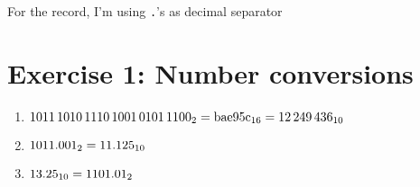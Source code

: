 \documentclass{gadsescript}
\begin{document}
\maketitle

For the record, I'm using \verb|.|'s as decimal separator
\section*{Exercise 1: Number conversions}
\begin{enumerate}[label=\alph*)]
	\item $ \binnum{1011 1010 1110 1001 0101 1100} = \hexnum{bae95c} = \decnum{12249436} $
	\item $ \binnum{1011.001} = \decnum{11.125} $
	\item $ \decnum{13.25} = \binnum{1101.01} $
\end{enumerate}
\end{document}
